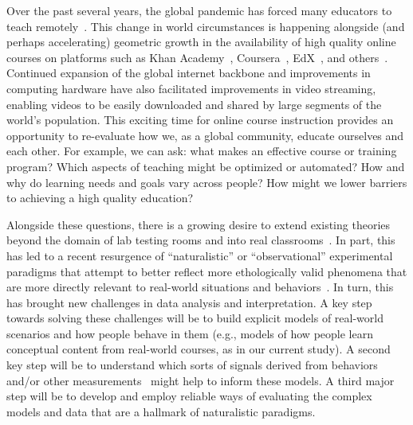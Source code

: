 \documentclass[10pt]{article}
\begin{document}
Over the past several years, the global pandemic has forced many educators to
teach remotely~\citep{MoseEtal21, ShimLee20, KawaEtal21, Whal20}. This change
in world circumstances is happening alongside (and perhaps accelerating)
geometric growth in the availability of high quality online courses on
platforms such as Khan Academy~\citep{Khan04}, Coursera~\citep{Youn12},
EdX~\citep{Kolo13}, and others~\citep{RhoaEtal13}. Continued expansion of the
global internet backbone and improvements in computing hardware have also
facilitated improvements in video streaming, enabling videos to be easily
downloaded and shared by large segments of the world's population. This
exciting time for online course instruction provides an opportunity to
re-evaluate how we, as a global community, educate ourselves and each other.
For example, we can ask: what makes an effective course or training program?
Which aspects of teaching might be optimized or automated? How and why do
learning needs and goals vary across people? How might we lower barriers to
achieving a high quality education?

Alongside these questions, there is a growing desire to extend existing
theories beyond the domain of lab testing rooms and into real
classrooms~\citep{Kauf03}. In part, this has led to a recent resurgence of
``naturalistic'' or ``observational'' experimental paradigms that attempt to
better reflect more ethologically valid phenomena that are more directly
relevant to real-world situations and behaviors~\citep{NastEtal20}. In turn,
this has brought new challenges in data analysis and interpretation. A key step
towards solving these challenges will be to build explicit models of real-world
scenarios and how people behave in them (e.g., models of how people learn
conceptual content from real-world courses, as in our current study). A second
key step will be to understand which sorts of signals derived from behaviors
and/or other measurements~\citep[e.g., neurophysiological data; ][]{NguyEtal22,
MeshEtal20, PoulEtal17, BeviEtal19, DikkEtal17} might help to inform these
models. A third major step will be to develop and employ reliable ways of
evaluating the complex models and data that are a hallmark of naturalistic
paradigms.
\end{document}
